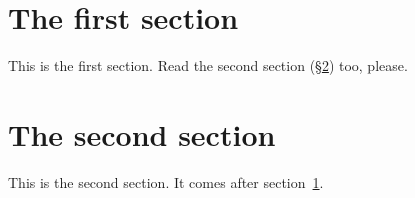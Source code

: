 \documentclass{article}
\begin{document}
\section{The first section}
\label{sec:first}
This is the first section. Read the second section (\S\ref{sec:another}) too, please.

\section{The second section}
\label{sec:another}
This is the second section. It comes after section~\ref{sec:first}.
\end{document}
